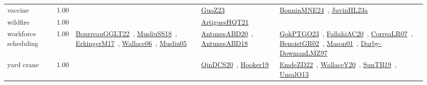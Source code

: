 {\begin{longtable}{p{3cm}r>{\raggedright\arraybackslash}p{6cm}>{\raggedright\arraybackslash}p{6cm}>{\raggedright\arraybackslash}p{8cm}}
\index{vaccine}\index{ApplicationAreas!vaccine}vaccine &  1.00 &  & \href{../works/GuoZ23.pdf}{GuoZ23}~\cite{GuoZ23} & \href{../works/BonninMNE24.pdf}{BonninMNE24}~\cite{BonninMNE24}, \href{../works/JuvinHL23a.pdf}{JuvinHL23a}~\cite{JuvinHL23a}\\
\index{wildfire}\index{ApplicationAreas!wildfire}wildfire &  1.00 &  & \href{../works/ArtiguesHQT21.pdf}{ArtiguesHQT21}~\cite{ArtiguesHQT21} & \\
\index{workforce scheduling}\index{ApplicationAreas!workforce scheduling}workforce scheduling &  1.00 & \href{../works/BourreauGGLT22.pdf}{BourreauGGLT22}~\cite{BourreauGGLT22}, \href{../works/MusliuSS18.pdf}{MusliuSS18}~\cite{MusliuSS18}, \href{../works/ErkingerM17.pdf}{ErkingerM17}~\cite{ErkingerM17}, \href{../works/Wallace06.pdf}{Wallace06}~\cite{Wallace06}, \href{../works/Musliu05.pdf}{Musliu05}~\cite{Musliu05} & \href{../works/AntunesABD20.pdf}{AntunesABD20}~\cite{AntunesABD20}, \href{../works/AntunesABD18.pdf}{AntunesABD18}~\cite{AntunesABD18} & \href{../works/GokPTGO23.pdf}{GokPTGO23}~\cite{GokPTGO23}, \href{../works/FallahiAC20.pdf}{FallahiAC20}~\cite{FallahiAC20}, \href{../works/CorreaLR07.pdf}{CorreaLR07}~\cite{CorreaLR07}, \href{../works/BenoistGR02.pdf}{BenoistGR02}~\cite{BenoistGR02}, \href{../works/Mason01.pdf}{Mason01}~\cite{Mason01}, \href{../works/Darby-DowmanLMZ97.pdf}{Darby-DowmanLMZ97}~\cite{Darby-DowmanLMZ97}\\
\index{yard crane}\index{ApplicationAreas!yard crane}yard crane &  1.00 &  & \href{../works/QinDCS20.pdf}{QinDCS20}~\cite{QinDCS20}, \href{../works/Hooker19.pdf}{Hooker19}~\cite{Hooker19} & \href{../works/EmdeZD22.pdf}{EmdeZD22}~\cite{EmdeZD22}, \href{../works/WallaceY20.pdf}{WallaceY20}~\cite{WallaceY20}, \href{../works/SunTB19.pdf}{SunTB19}~\cite{SunTB19}, \href{../works/UnsalO13.pdf}{UnsalO13}~\cite{UnsalO13}\\
\end{longtable}
}

\clearpage
